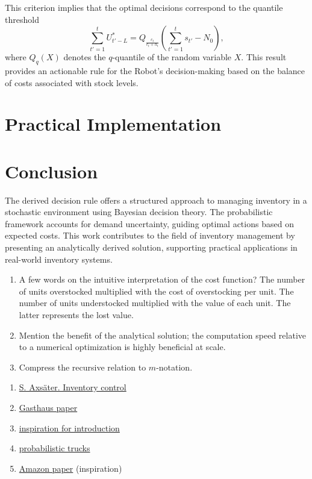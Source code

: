 \documentclass[a4paper,12pt]{article}
\theoremstyle{definition}
\begin{document}
	This criterion implies that the optimal decisions correspond to the quantile threshold
	\begin{equation}
		\sum_{t'=1}^{t} U_{t'-L}^* = Q_{\frac{c_t}{c_t+h_t}} \left( \sum_{t'=1}^{t} s_{t'} - N_0 \right),
	\end{equation}
	where $Q_q(X)$ denotes the $q$-quantile of the random variable $X$. This result provides an actionable rule for the Robot’s decision-making based on the balance of costs associated with stock levels.
	
	\section{Practical Implementation}
	
	
	
	\section{Conclusion}
	The derived decision rule offers a structured approach to managing inventory in a stochastic environment using Bayesian decision theory. The probabilistic framework accounts for demand uncertainty, guiding optimal actions based on expected costs. This work contributes to the field of inventory management by presenting an analytically derived solution, supporting practical applications in real-world inventory systems.
	
	\begin{enumerate}
		\item A few words on the intuitive interpretation of the cost function? The number of units overstocked multiplied with the cost of overstocking per unit. The number of units understocked multiplied with the value of each unit. The latter represents the lost value.
		\item Mention the benefit of the analytical solution; the computation speed relative to a numerical optimization is highly beneficial at scale.
		\item Compress the recursive relation to $m$-notation. 
		
	\end{enumerate}
	
	\begin{enumerate}
		\item \href{https://www.academia.edu/27965536/Inventorycontroltextbook_140429044831_phpapp02_1_}{S. Axsäter. Inventory control}
		\item \href{https://proceedings.mlr.press/v151/kan22a/kan22a.pdf}{Gasthaus paper}
		\item \href{https://arxiv.org/pdf/2012.02392}{inspiration for introduction}
		\item \href{https://arxiv.org/pdf/2310.17168}{probabilistic trucks}
		\item \href{https://arxiv.org/pdf/2310.16096}{Amazon paper} (inspiration)
	\end{enumerate}
	
	\newpage
	\begin{appendices}
		
	\end{appendices}
	
	
	
	
	
	
\end{document}
